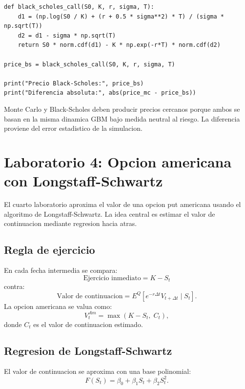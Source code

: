 \documentclass[12pt,a4paper]{article}
\begin{document}
\begin{lstlisting}[style=pythonstyle]
def black_scholes_call(S0, K, r, sigma, T):
    d1 = (np.log(S0 / K) + (r + 0.5 * sigma**2) * T) / (sigma * np.sqrt(T))
    d2 = d1 - sigma * np.sqrt(T)
    return S0 * norm.cdf(d1) - K * np.exp(-r*T) * norm.cdf(d2)

price_bs = black_scholes_call(S0, K, r, sigma, T)

print("Precio Black-Scholes:", price_bs)
print("Diferencia absoluta:", abs(price_mc - price_bs))
\end{lstlisting}

\begin{interpretacion}
Monte Carlo y Black-Scholes deben producir precios cercanos porque ambos se basan en la misma dinamica GBM bajo medida neutral al riesgo. La diferencia proviene del error estadistico de la simulacion.
\end{interpretacion}

\section{Laboratorio 4: Opcion americana con Longstaff-Schwartz}

\begin{markdowncell}
El cuarto laboratorio aproxima el valor de una opcion put americana usando el algoritmo de Longstaff-Schwartz. La idea central es estimar el valor de continuacion mediante regresion hacia atras.
\end{markdowncell}

\subsection{Regla de ejercicio}

\begin{latexcell}
En cada fecha intermedia se compara:
\[
\text{Ejercicio inmediato}=K-S_t
\]
contra:
\[
\text{Valor de continuacion}=E^Q[e^{-r\Delta t}V_{t+\Delta t}\mid S_t].
\]
La opcion americana se valua como:
\[
V_t^{Am}=\max(K-S_t,\;C_t),
\]
donde \(C_t\) es el valor de continuacion estimado.
\end{latexcell}

\subsection{Regresion de Longstaff-Schwartz}

\begin{latexcell}
El valor de continuacion se aproxima con una base polinomial:
\[
F(S_t)=\beta_0+\beta_1S_t+\beta_2S_t^2.
\]
\end{latexcell}
\end{document}
